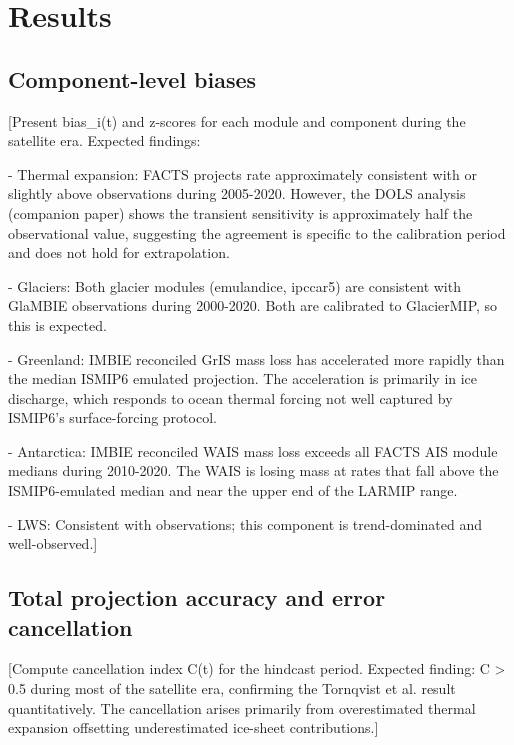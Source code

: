 \documentclass[11pt]{article}
\begin{document}
\section{Results}
\label{sec:results}

\subsection{Component-level biases}
\label{sec:bias}

[Present bias_i(t) and z-scores for each module and component during the satellite era. Expected findings:

- Thermal expansion: FACTS projects rate approximately consistent with or slightly above observations during 2005-2020. However, the DOLS analysis (companion paper) shows the transient sensitivity is approximately half the observational value, suggesting the agreement is specific to the calibration period and does not hold for extrapolation.

- Glaciers: Both glacier modules (emulandice, ipccar5) are consistent with GlaMBIE observations during 2000-2020. Both are calibrated to GlacierMIP, so this is expected.

- Greenland: IMBIE reconciled GrIS mass loss has accelerated more rapidly than the median ISMIP6 emulated projection. The acceleration is primarily in ice discharge, which responds to ocean thermal forcing not well captured by ISMIP6's surface-forcing protocol.

- Antarctica: IMBIE reconciled WAIS mass loss exceeds all FACTS AIS module medians during 2010-2020. The WAIS is losing mass at rates that fall above the ISMIP6-emulated median and near the upper end of the LARMIP range.

- LWS: Consistent with observations; this component is trend-dominated and well-observed.]

\subsection{Total projection accuracy and error cancellation}
\label{sec:cancellation}

[Compute cancellation index C(t) for the hindcast period. Expected finding: C > 0.5 during most of the satellite era, confirming the Tornqvist et al. result quantitatively. The cancellation arises primarily from overestimated thermal expansion offsetting underestimated ice-sheet contributions.]
\end{document}
